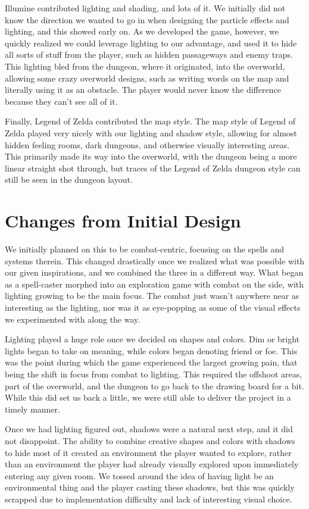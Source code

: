 \documentclass{sigchi}
\begin{document}
Illumine contributed lighting and shading, and lots of it.  We initially did not know the direction we wanted to go in when designing the particle effects and lighting, and this
showed early on.  As we developed the game, however, we quickly realized we could leverage lighting to our advantage, and used it to hide all sorts of stuff from the player, such
as hidden passageways and enemy traps.  This lighting bled from the dungeon, where it originated, into the overworld, allowing some crazy overworld designs, such as writing words on the 
map and literally using it as an obstacle.  The player would never know the difference because they can't see all of it.

Finally, Legend of Zelda contributed the map style.  The map style of Legend of Zelda played very nicely with our lighting and shadow style, allowing for almost hidden feeling rooms,
dark dungeons, and otherwise visually interesting areas.  This primarily made its way into the overworld, with the dungeon being a more linear straight shot through, but traces 
of the Legend of Zelda dungeon style can still be seen in the dungeon layout.

\section{Changes from Initial Design}
We initially planned on this to be combat-centric, focusing on the spells and systems therein.  This changed drastically once we realized what was possible with our given inspirations, and we combined 
the three in a different way.  What began as a spell-caster morphed into an exploration game with combat on the side, with lighting growing to be the main focus.  The combat just wasn't anywhere near
as interesting as the lighting, nor was it as eye-popping as some of the visual effects we experimented with along the way.

Lighting played a huge role once we decided on shapes and colors.  Dim or bright lights began to take on meaning, while colors began denoting friend or foe.  
This was the point during which the game experienced the largest growing pain, that being the shift in focus from combat to lighting.  
This required the offshoot areas, part of the overworld, and the dungeon to go back to the drawing board for a bit.  While this did set us back a little, we were still able to deliver the project in 
a timely manner.

Once we had lighting figured out, shadows were a natural next step, and it did not disappoint.  The ability to combine creative shapes and colors with shadows to hide most of it created 
an environment the player wanted to explore, rather than an environment the player had already visually explored upon immediately entering any given room.  We tossed around the idea 
of having light be an environmental thing and the player casting these shadows, but this was quickly scrapped due to implementation difficulty and lack of interesting visual choice.
\end{document}
